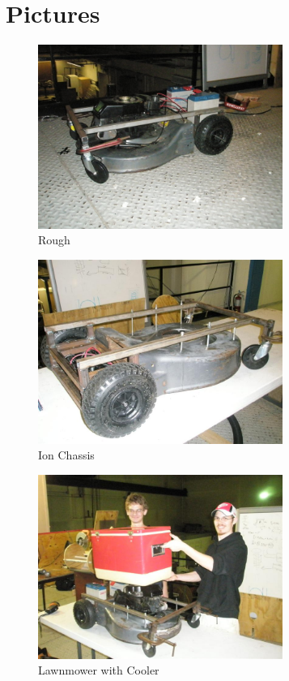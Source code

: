 \documentclass[12pt]{article}%
\begin{document}
\section{Pictures}%

    \begin{figure}[h]
        \begin{center}
            \includegraphics[width=8cm]{pc130042jn1.jpg}
        \end{center}
        \caption{Rough}
        \label{figure:Rough}
    \end{figure}

    \begin{figure}[h]
        \begin{center}
            \includegraphics[width=8cm]{Ion_Chassis.jpg}
        \end{center}
        \caption{Ion Chassis}
        \label{figure:Chassis}
    \end{figure}

    \begin{figure}[h]
        \begin{center}
            \includegraphics[width=8cm]{ION_and_Cooler.jpg}
        \end{center}
        \caption{Lawnmower with Cooler}
        \label{figure:wcooler}
    \end{figure}
\end{document}
